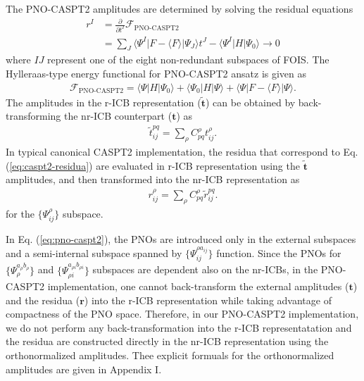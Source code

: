 \documentclass[aip,jcp,amsmath]{revtex4-1}
\begin{document}
The PNO-CASPT2 amplitudes are determined by solving the residual equations
%
\begin{align}
  r^I&=\frac{\partial}{\partial t^I}\mathscr{F}_\text{PNO-CASPT2} \nonumber \\
     &=\sum_J \langle\Psi^I|F-\langle F\rangle|\Psi_J\rangle t^J-\langle\Psi^I|H|\Psi_0\rangle\rightarrow 0 \label{eq:caspt2-residua}
\end{align}
%
where $IJ$ represent one of the eight non-redundant subspaces of FOIS.
%
The Hylleraas-type energy functional for PNO-CASPT2 ansatz is given as
%
\begin{align}
  \mathscr{F}_\text{PNO-CASPT2}=\langle\Psi|H|\Psi_0\rangle+\langle\Psi_0|H|\Psi\rangle+\langle\Psi|F-\langle F\rangle|\Psi\rangle.
\end{align}
%
The amplitudes in the r-ICB representation ($\tilde{\mathbf{t}}$) can be obtained by back-transforming the nr-ICB counterpart ($\mathbf{t}$) as
%
\begin{align}
  \tilde{t}^{pq}_{ij} = \sum_{\rho} C_{pq}^\rho  t^{\rho}_{ij}.
\end{align}
%
In typical canonical CASPT2 implementation, the residua that correspond to Eq. (\ref{eq:caspt2-residua}) are evaluated in r-ICB representation using the $\tilde{\mathbf{t}}$ amplitudes, and then transformed into the nr-ICB representation as
%
\begin{align}
  r^{\rho}_{ij}=\sum_{\rho} C_{pq}^\rho \tilde{r}^{pq}_{ij}.
\end{align}
for the $\{\Psi^{\rho}_{ij}\}$ subspace.

%
In Eq. (\ref{eq:pno-caspt2}), the PNOs are introduced only in the external subspaces and a semi-internal subspace spanned by $\{\Psi_{ij}^{\rho a_{ij}}\}$ function.
%
Since the PNOs for $\{\Psi_{\rho}^{a_{\rho}b_{\rho}}\}$ and $\{\Psi_{\rho i}^{a_{\rho i}b_{\rho i}}\}$ subspaces are dependent also on the nr-ICBs, in the PNO-CASPT2 implementation, one cannot back-transform the external amplitudes ($\mathbf{t}$) and the residua ($\mathbf{r}$) into the r-ICB representation while taking advantage of compactness of the PNO space.
%
Therefore, in our PNO-CASPT2 implementation, we do not perform any back-transformation into the r-ICB representatation and the residua are constructed directly in the nr-ICB representation using the orthonormalized amplitudes.
%
Thee explicit formuals for the orthonormalized amplitudes are given in Appendix I.
\end{document}
